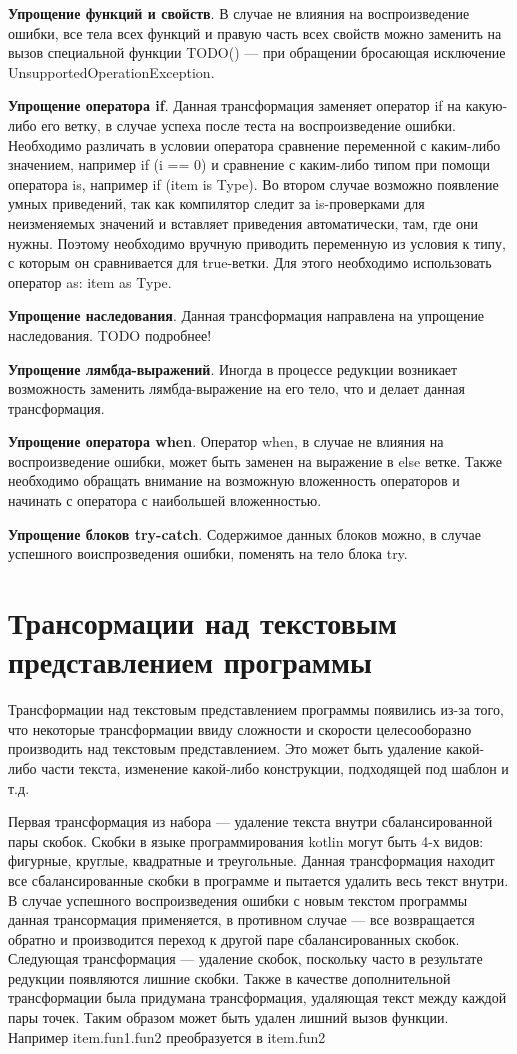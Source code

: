 \textbf{Упрощение функций и свойств}. В случае не влияния на воспроизведение ошибки, все тела всех функций и правую часть всех свойств можно заменить на вызов специальной функции TODO() --- при обращении бросающая исключение UnsupportedOperationException.

\textbf{Упрощение оператора if}. Данная трансформация заменяет оператор if на какую-либо его ветку, в случае успеха после теста на воспроизведение ошибки. Необходимо различать в условии оператора сравнение переменной с каким-либо значением, например if (i == 0) и сравнение с каким-либо типом при помощи оператора is, например if (item is Type). Во втором случае возможно появление умных приведений, так как компилятор следит за is-проверками для неизменяемых значений и вставляет приведения автоматически, там, где они нужны. Поэтому необходимо вручную приводить переменную из условия к типу, с которым он сравнивается для true-ветки. Для этого необходимо использовать оператор as: item as Type.

\textbf{Упрощение наследования}. Данная трансформация направлена на упрощение наследования. TODO подробнее!

\textbf{Упрощение лямбда-выражений}. Иногда в процессе редукции возникает возможность заменить лямбда-выражение на его тело, что и делает данная трансформация. 

\textbf{Упрощение оператора when}. Оператор when, в случае не влияния на воспроизведение ошибки, может быть заменен на выражение в else ветке. Также необходимо обращать внимание на возможную вложенность операторов и начинать с оператора с наибольшей вложенностью.

\textbf{Упрощение блоков try-catch}. Содержимое данных блоков можно, в случае успешного воиспрозведения ошибки, поменять на тело блока try.


\section{Трансормации над текстовым представлением программы}
Трансформации над текстовым представлением программы появились из-за того, что некоторые трансформации ввиду сложности и скорости целесооборазно производить над текстовым представлением. Это может быть удаление какой-либо части текста, изменение какой-либо конструкции, подходящей под шаблон и т.д.

Первая трансформация из набора --- удаление текста внутри сбалансированной пары скобок. Скобки в языке программирования kotlin могут быть 4-х видов: фигурные, круглые, квадратные и треугольные. Данная трансформация находит все сбалансированные скобки в программе и пытается удалить весь текст внутри. В случае успешного воспроизведения ошибки с новым текстом программы данная трансормация применяется, в противном случае --- все возвращается обратно и производится переход к другой паре сбалансированных скобок. Следующая трансформация --- удаление скобок, поскольку часто в результате редукции появляются лишние скобки. Также в качестве дополнительной трансформации была придумана трансформация, удаляющая текст между каждой пары точек. Таким образом может быть удален лишний вызов функции. Например item.fun1.fun2 преобразуется в item.fun2

